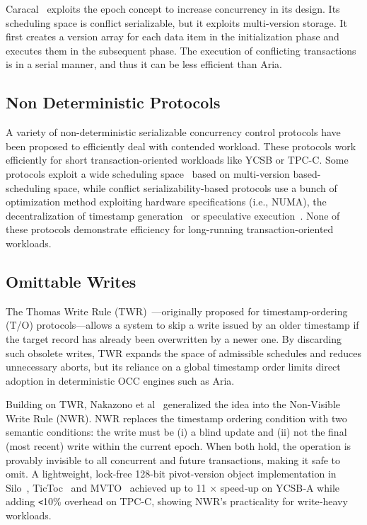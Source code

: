 \documentclass[english,preprint,JIP]{ipsj}
\begin{document}
%

Caracal~\cite{qin2021caracal} exploits the epoch concept to increase concurrency in its design. Its scheduling space is conflict serializable, but it exploits multi-version storage. It first creates a version array for each data item in the initialization phase and executes them in the subsequent phase. 
%
The execution of conflicting transactions is in a serial manner, and thus it can be less efficient than Aria.
%
\subsection{Non Deterministic Protocols}
A variety of non-deterministic serializable concurrency control protocols have been proposed to efficiently deal with contended workload.
These protocols work efficiently for short transaction-oriented workloads like YCSB or TPC-C.
%
Some protocols exploit a wide scheduling space~\cite{ermia} based on multi-version based-scheduling space, while conflict serializability-based protocols use a bunch of optimization method exploiting hardware specifications (i.e., NUMA), the decentralization of timestamp generation~\cite{tu2013speedy} or speculative execution~\cite{nakamori2022decentralization,polaris}.
%                                                                       
None of these protocols demonstrate efficiency for long-running transaction-oriented workloads.

\subsection{Omittable Writes}
The Thomas Write Rule (TWR)~\cite{10.1145/320071.320076}—originally proposed for timestamp‑ordering (T/O) protocols—allows a system to skip a write issued by an older timestamp if the target record has already been overwritten by a newer one. By discarding such obsolete writes, TWR expands the space of admissible schedules and reduces unnecessary aborts, but its reliance on a global timestamp order limits direct adoption in deterministic OCC engines such as Aria.

Building on TWR, Nakazono et al~\cite{nakazono2019nwr} generalized the idea into the Non‑Visible Write Rule (NWR). NWR replaces the timestamp ordering condition with two semantic conditions: the write must be (i) a blind update and (ii) not the final (most recent) write within the current epoch. When both hold, the operation is provably invisible to all concurrent and future transactions, making it safe to omit. A lightweight, lock-free 128-bit pivot-version object implementation in Silo~\cite{tu2013speedy}, TicToc~\cite{yu2016tictoc} and MVTO~\cite{lim2017cicada} achieved up to 11 × speed‑up on YCSB‑A while adding \verb|<|10\% overhead on TPC‑C, showing NWR’s practicality for write‑heavy workloads.
\end{document}
